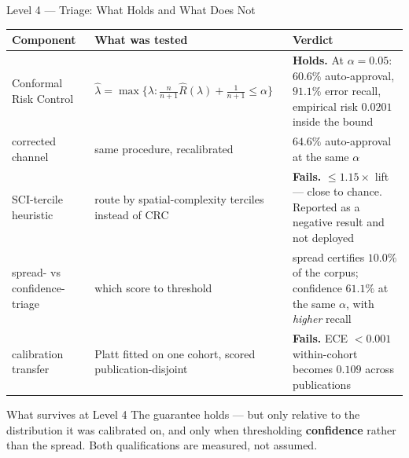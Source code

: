 \documentclass[aspectratio=169,11pt]{beamer}
\begin{document}
\begin{frame}{Level 4 --- Triage: What Holds and What Does Not}
\scriptsize
\begin{center}
\tiny
\begin{tabular}{@{}l p{3.6cm} p{4.4cm}@{}}
\toprule
\textbf{Component} & \textbf{What was tested} & \textbf{Verdict} \\
\midrule
Conformal Risk Control & $\hat\lambda = \max\{\lambda : \tfrac{n}{n+1}\hat{R}(\lambda) + \tfrac{1}{n+1} \le \alpha\}$ & \textbf{Holds.} At $\alpha{=}0.05$: $60.6\%$ auto-approval, $91.1\%$ error recall, empirical risk $0.0201$ inside the bound \\
\addlinespace
corrected channel & same procedure, recalibrated & $\mathbf{64.6\%}$ auto-approval at the same $\alpha$ \\
\addlinespace
SCI-tercile heuristic & route by spatial-complexity terciles instead of CRC & \textbf{Fails.} $\le 1.15\times$ lift --- close to chance. Reported as a negative result and not deployed \\
\addlinespace
spread- vs confidence-triage & which score to threshold & spread certifies $\mathbf{10.0\%}$ of the corpus; confidence $\mathbf{61.1\%}$ at the same $\alpha$, with \emph{higher} recall \\
\addlinespace
calibration transfer & Platt fitted on one cohort, scored publication-disjoint & \textbf{Fails.} ECE $<0.001$ within-cohort becomes $\mathbf{0.109}$ across publications \\
\bottomrule
\end{tabular}
\end{center}
\vspace{-1mm}
\begin{exampleblock}{\scriptsize What survives at Level 4}
\scriptsize The guarantee holds --- but only relative to the distribution it was calibrated on, and only when thresholding \textbf{confidence} rather than the spread. Both qualifications are measured, not assumed.
\end{exampleblock}
\end{frame}
\end{document}
